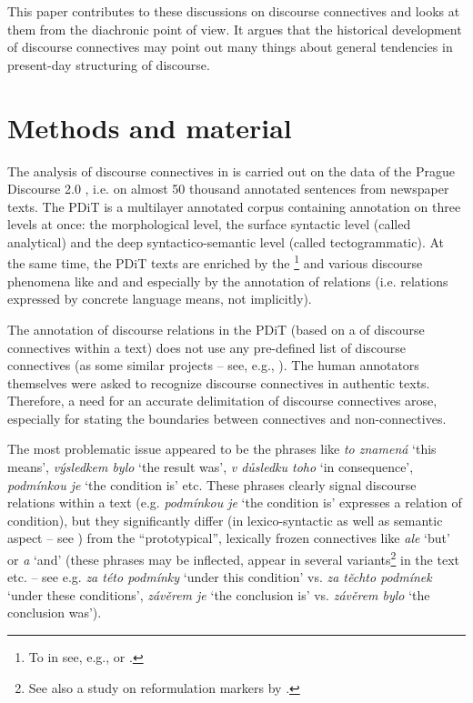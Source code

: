 \documentclass[output=paper]{langsci/langscibook.cls}
\begin{document}
This paper contributes to these discussions on discourse connectives and looks at them from the diachronic point of view. It argues that the historical development of discourse connectives may point out many things about general tendencies in present-day structuring of discourse.



\section{Methods and material}

The analysis of discourse connectives in  is carried out on the data of the Prague Discourse  2.0 \citep[PDiT;][]{biblio:RySyPragueDiscourse2016}, i.e. on almost 50 thousand annotated sentences from  newspaper texts. The PDiT is a multilayer annotated corpus containing annotation on three levels at once: the morphological level, the surface syntactic level (called analytical) and the deep syntactico-semantic level (called tectogrammatic). At the same time, the PDiT texts are enriched by the \footnote{To  in  see, e.g., \citet{hajicova2013topic} or \citet{biblio:RyOslovosledu2014}.} and various discourse phenomena like  and  and especially by the annotation of  relations (i.e. relations expressed by concrete language means, not implicitly).

The annotation of discourse relations in the PDiT (based on a  of discourse connectives within a text) does not use any pre-defined list of discourse connectives (as some similar projects – see, e.g., \citealt{prasad2008penn}). The human annotators themselves were asked to recognize discourse connectives in authentic texts. Therefore, a need for an accurate delimitation of discourse connectives arose, especially for stating the boundaries between connectives and non-connectives. 

The most problematic issue appeared to be the  phrases like \textit{to znamená} `this means', \textit{výsledkem bylo} `the result was', \textit{v důsledku toho} `in consequence', \textit{podmínkou je} `the condition is' etc. These phrases clearly signal discourse relations within a text (e.g. \textit{podmínkou je} `the condition is' expresses a relation of condition), but they significantly differ (in lexico-syntactic as well as semantic aspect -- see \citealt{rysova2012LREC}) from the ``prototypical'', lexically frozen connectives like \textit{ale} `but' or \textit{a} `and' (these phrases may be inflected, appear in several variants\footnote{ See also a study on reformulation markers by \citet{cuenca2003two}.} in the text etc. – see e.g. \textit{za této podmínky} `under this condition' vs. \textit{za těchto podmínek} `under these conditions', \textit{závěrem je} `the conclusion is' vs. \textit{závěrem bylo} `the conclusion was'). 
\end{document}
